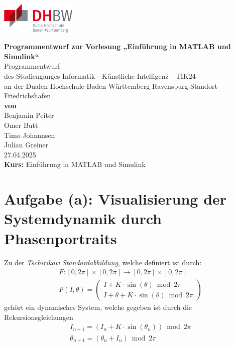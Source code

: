 \documentclass[paper=a4, 
                DIV=12]{scrartcl}
\newcommand{\thesisauthor}{Benjamin Peiter \\ Omer Butt \\ Timo Johannsen \\ Julian Greiner}
\newcommand{\thesiscourse}{Einführung in MATLAB und Simulink}
\newcommand{\thesisstudy}{Informatik - Künstliche Intelligenz - TIK24}
\newcommand{\thesistype}{Programmentwurf}
\newcommand{\thesistitle}{Programmentwurf zur Vorlesung „Einführung in MATLAB und Simulink“}
\newcommand{\thesisdate}{27.04.2025}
\begin{document}
\begingroup
    \begin{flushright} %
        \includegraphics[height=1.5cm]{figures/dhbw.png}
    \end{flushright} 
    \centering
    \vspace*{1cm}
    \Large
    \textbf{\thesistitle} \\
    \vspace*{3cm}
    \normalsize
    \thesistype \\
    \vspace*{2.5cm}
    des Studienganges \thesisstudy \\
    an der Dualen Hochschule Baden-Württemberg Ravensburg Standort Friedrichshafen\\
    \vspace*{2.5cm}
    \textbf{von}\\
    \thesisauthor \\
    \vfill
    \thesisdate\\
    \vspace*{1cm}
    \textbf{Kurs:} \thesiscourse\\
    \normalsize

\endgroup

\newpage
\tableofcontents
\newpage

\section{Aufgabe (a): Visualisierung der Systemdynamik durch Phasenportraits}
Zu der \textit{Tschirikow Standardabbildung}, welche definiert ist durch:
\begin{gather*}
    F: [0,2\pi] \times [0,2\pi] \to [0,2\pi] \times [0,2\pi] \\
    F(I, \theta) = 
    \begin{pmatrix}
        I + K \cdot \sin(\theta) \bmod 2\pi \\
        I + \theta + K \cdot \sin(\theta) \bmod 2\pi
    \end{pmatrix}
\end{gather*}
gehört ein dynamisches System, welche gegeben ist durch die Rekursionsgleichungen
\begin{gather*}
    I_{n+1} = (I_n + K \cdot \sin(\theta_n)) \bmod 2\pi \\
    \theta_{n+1} = (\theta_n + I_n) \bmod 2\pi
\end{gather*}
\end{document}

